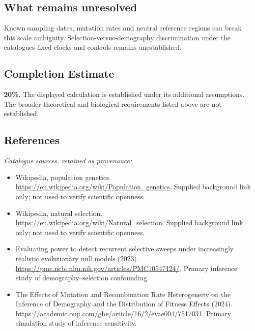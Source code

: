 \documentclass[11pt]{article}
\begin{document}
\subsection{What remains unresolved}
Known sampling dates, mutation rates and neutral reference regions can break this scale ambiguity. Selection-versus-demography discrimination under the catalogue\textquotesingle s fixed clocks and controls remains unestablished.
\subsection{Completion Estimate}
\textbf{20\%.} The displayed calculation is established under its additional assumptions. The broader theoretical and biological requirements listed above are not established.
\subsection{References}
\noindent\emph{Catalogue sources, retained as provenance:}
\begin{itemize}
\item Wikipedia, population genetics. \url{https://en.wikipedia.org/wiki/Population_genetics}. Supplied background link only; not used to verify scientific openness.
\item Wikipedia, natural selection. \url{https://en.wikipedia.org/wiki/Natural_selection}. Supplied background link only; not used to verify scientific openness.
\item Evaluating power to detect recurrent selective sweeps under increasingly realistic evolutionary null models (2023). \url{https://pmc.ncbi.nlm.nih.gov/articles/PMC10547124/}. Primary inference study of demography--selection confounding.
\item The Effects of Mutation and Recombination Rate Heterogeneity on the Inference of Demography and the Distribution of Fitness Effects (2024). \url{https://academic.oup.com/gbe/article/16/2/evae004/7517031}. Primary simulation study of inference sensitivity.
\end{itemize}
\clearpage


\appendix
\end{document}
